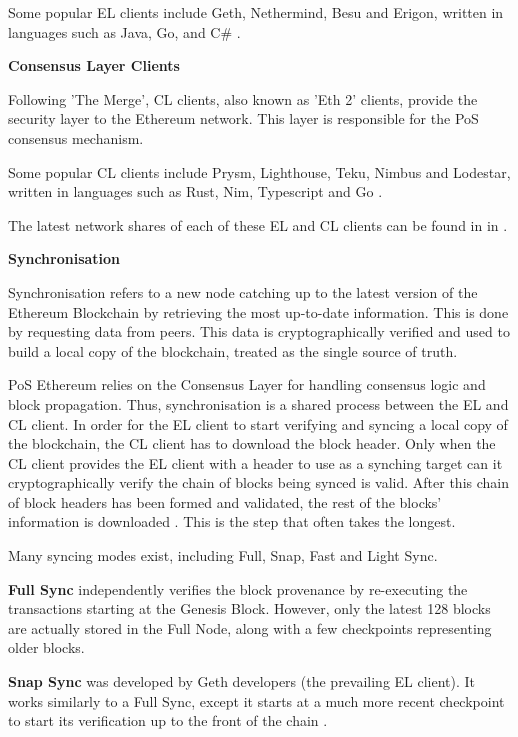 Some popular EL clients include Geth, Nethermind, Besu and Erigon, written in languages such as Java, Go, and C\# \cite{EthereumEthereum.org}. 

\textbf{Consensus Layer Clients }

Following 'The Merge', CL clients, also known as 'Eth 2' clients, provide the security layer to the Ethereum network. This layer is responsible for the PoS consensus mechanism.

Some popular CL clients include Prysm, Lighthouse, Teku, Nimbus and Lodestar, written in languages such as Rust, Nim, Typescript and Go \cite{EthereumEthereum.org}. 

The latest network shares of each of these EL and CL clients can be found in  in .

\textbf{Synchronisation} 
\label{SyncLitRev}

Synchronisation refers to a new node catching up to the latest version of the Ethereum Blockchain by retrieving the most up-to-date information. This is done by requesting data from peers. This data is cryptographically verified and used to build a local copy of the blockchain, treated as the single source of truth.

PoS Ethereum relies on the Consensus Layer for handling consensus logic and block propagation. Thus, synchronisation is a shared process between the EL and CL client. In order for the EL client to start verifying and syncing a local copy of the blockchain, the CL client has to download the block header. Only when the CL client provides the EL client with a header to use as a synching target can it cryptographically verify the chain of blocks being synced is valid. After this chain of block headers has been formed and validated, the rest of the blocks' information is downloaded \cite{2022DeveloperGo-ethereum}. This is the step that often takes the longest.

Many syncing modes exist, including Full, Snap, Fast and Light Sync.

\textbf{Full Sync }independently verifies the block provenance by re-executing the transactions starting at the Genesis Block. However, only the latest 128 blocks are actually stored in the Full Node, along with a few checkpoints representing older blocks. 

\textbf{Snap Sync }was developed by Geth developers (the prevailing EL client). It works similarly to a Full Sync, except it starts at a much more recent checkpoint to start its verification up to the front of the chain \cite{2022DeveloperGo-ethereum}.


